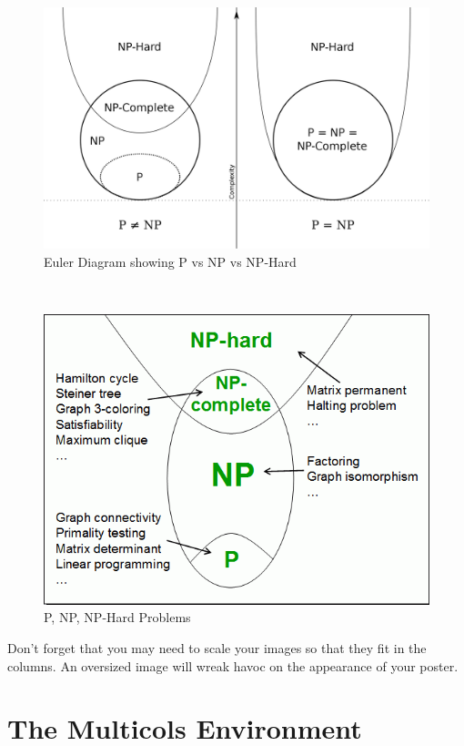 \documentclass[landscape]{sciposter}
\begin{document}
\begin{multicols}{4}
\begin{figure}
\centering
\includegraphics[scale=0.30]{P_vs_NP_Euler_Diagram}
\caption{Euler Diagram showing P vs NP vs NP-Hard}
\end{figure}
\\
\begin{figure}
\centering
\includegraphics[scale=1.0]{examples_time_complexity.png}
\caption{P, NP, NP-Hard Problems}
\end{figure}

Don't forget that you may need to scale your images so that they fit in the columns.  An oversized image will wreak havoc on the appearance of your poster.


\section{The Multicols Environment}


\end{multicols}
\end{document}
